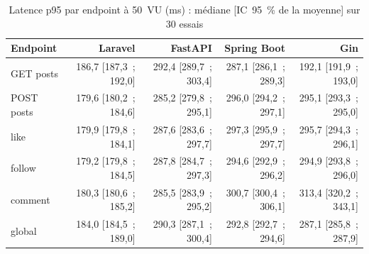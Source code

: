 \begin{table}[htbp]
\centering
\small
\caption{Latence p95 par endpoint à 50~VU (ms) : médiane [IC~95~\% de la moyenne] sur 30 essais}
\label{tab:p95-endpoints}
\begin{tabular}{lrrrr}
\toprule
Endpoint & Laravel & FastAPI & Spring Boot & Gin \\
\midrule
GET posts & 186,7 [187,3~; 192,0] & 292,4 [289,7~; 303,4] & 287,1 [286,1~; 289,3] & 192,1 [191,9~; 193,0] \\
POST posts & 179,6 [180,2~; 184,6] & 285,2 [279,8~; 295,1] & 296,0 [294,2~; 297,1] & 295,1 [293,3~; 295,0] \\
like & 179,9 [179,8~; 184,1] & 287,6 [283,6~; 297,7] & 297,3 [295,9~; 297,7] & 295,7 [294,3~; 296,1] \\
follow & 179,2 [179,8~; 184,5] & 287,8 [284,7~; 297,3] & 294,6 [292,9~; 296,2] & 294,9 [293,8~; 296,0] \\
comment & 180,3 [180,6~; 185,2] & 285,5 [283,9~; 295,2] & 300,7 [300,4~; 306,1] & 313,4 [320,2~; 343,1] \\
global & 184,0 [184,5~; 189,0] & 290,3 [287,1~; 300,4] & 292,8 [292,7~; 294,6] & 287,1 [285,8~; 287,9] \\
\bottomrule
\end{tabular}
\end{table}
